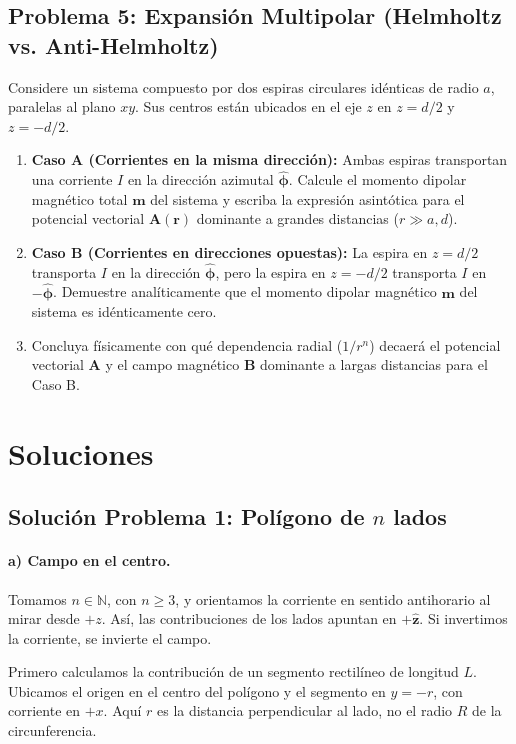 \documentclass[11pt]{article}
\newcommand{\ez}{\hat{\mathbf{z}}}
\begin{document}
\subsection*{Problema 5: Expansión Multipolar (Helmholtz vs. Anti-Helmholtz)}
Considere un sistema compuesto por dos espiras circulares idénticas de radio $a$, paralelas al plano $xy$. Sus centros están ubicados en el eje $z$ en $z = d/2$ y $z = -d/2$.
\begin{enumerate}
    \item[a)] \textbf{Caso A (Corrientes en la misma dirección):} Ambas espiras transportan una corriente $I$ en la dirección azimutal $\hat{\boldsymbol{\phi}}$. Calcule el momento dipolar magnético total $\mathbf{m}$ del sistema y escriba la expresión asintótica para el potencial vectorial $\mathbf{A}(\mathbf{r})$ dominante a grandes distancias ($r \gg a, d$).
    \item[b)] \textbf{Caso B (Corrientes en direcciones opuestas):} La espira en $z=d/2$ transporta $I$ en la dirección $\hat{\boldsymbol{\phi}}$, pero la espira en $z=-d/2$ transporta $I$ en $-\hat{\boldsymbol{\phi}}$. Demuestre analíticamente que el momento dipolar magnético $\mathbf{m}$ del sistema es idénticamente cero.
    \item[c)] Concluya físicamente con qué dependencia radial ($1/r^n$) decaerá el potencial vectorial $\mathbf{A}$ y el campo magnético $\mathbf{B}$ dominante a largas distancias para el Caso B.
\end{enumerate}

\clearpage
\section*{Soluciones}

\subsection*{Solución Problema 1: Polígono de $n$ lados}

\paragraph{a) Campo en el centro.}
Tomamos $n\in\mathbb N$, con $n\geq3$, y orientamos la corriente
en sentido antihorario al mirar desde $+z$. Así, las contribuciones
de los lados apuntan en $+\ez$. Si invertimos la corriente, se
invierte el campo.

Primero calculamos la contribución de un segmento rectilíneo de
longitud $L$. Ubicamos el origen en el centro del polígono y el
segmento en $y=-r$, con corriente en $+x$. Aquí $r$ es la distancia
perpendicular al lado, no el radio $R$ de la circunferencia.
\end{document}
